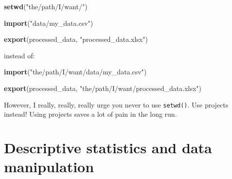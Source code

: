 \documentclass[]{gitbook}
\newenvironment{Shaded}{\begin{snugshade}}{\end{snugshade}}
\newcommand{\KeywordTok}[1]{\textcolor[rgb]{0.13,0.29,0.53}{\textbf{#1}}}
\newcommand{\NormalTok}[1]{#1}
\newcommand{\StringTok}[1]{\textcolor[rgb]{0.31,0.60,0.02}{#1}}
\begin{document}
\begin{Shaded}
\begin{Highlighting}[]
\KeywordTok{setwd}\NormalTok{(}\StringTok{"the/path/I/want/"}\NormalTok{)}

\KeywordTok{import}\NormalTok{(}\StringTok{"data/my_data.csv"}\NormalTok{)}

\KeywordTok{export}\NormalTok{(processed_data, }\StringTok{"processed_data.xlsx"}\NormalTok{)}
\end{Highlighting}
\end{Shaded}

instead of:

\begin{Shaded}
\begin{Highlighting}[]
\KeywordTok{import}\NormalTok{(}\StringTok{"the/path/I/want/data/my_data.csv"}\NormalTok{)}

\KeywordTok{export}\NormalTok{(processed_data, }\StringTok{"the/path/I/want/processed_data.xlsx"}\NormalTok{)}
\end{Highlighting}
\end{Shaded}

However, I really, really, really urge you never to use \texttt{setwd()}. Use projects instead!
Using projects saves a lot of pain in the long run.

\hypertarget{descriptive-statistics-and-data-manipulation}{%
\section{Descriptive statistics and data manipulation}\label{descriptive-statistics-and-data-manipulation}}
\end{document}
